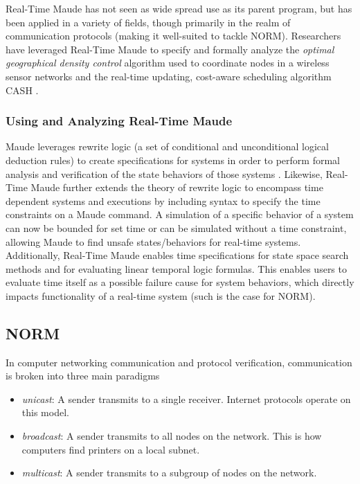 \documentclass[10pt, journal]{IEEEtran}
\begin{document}
Real-Time Maude has not seen as wide spread use as its parent program, but has been applied in a variety of fields, though primarily in the realm of communication protocols (making it well-suited to tackle NORM). Researchers have leveraged Real-Time Maude to specify and formally analyze the \textit{optimal geographical density control} algorithm used to coordinate nodes in a wireless sensor networks and the real-time updating, cost-aware scheduling algorithm CASH \cite{Thorvaldsen2007, Caccamo2006}.

\subsubsection{Using and Analyzing Real-Time Maude}

Maude leverages rewrite logic (a set of conditional and unconditional logical deduction rules) to create specifications for systems in order to perform formal analysis and verification of the state behaviors of those systems \cite{Meseguer1992}. Likewise, Real-Time Maude further extends the theory of rewrite logic to encompass time dependent systems and executions by including syntax to specify the time constraints on a Maude command. A simulation of a specific behavior of a system can now be bounded for set time or can be simulated without a time constraint, allowing Maude to find unsafe states/behaviors for real-time systems. Additionally, Real-Time Maude enables time specifications for state space search methods and for evaluating linear temporal logic formulas. This enables users to evaluate time itself as a possible failure cause for system behaviors, which directly impacts functionality of a real-time system (such is the case for NORM).

\subsection{NORM}
In computer networking communication and protocol verification, communication is broken into three main paradigms
\begin{itemize}
	\item \textit{unicast}: A sender transmits to a single receiver. Internet protocols operate on this model.
	\item \textit{broadcast}: A sender transmits to all nodes on the network. This is how computers find printers on a local subnet.
	\item \textit{multicast}: A sender transmits to a subgroup of nodes on the network.
\end{itemize}
\end{document}
